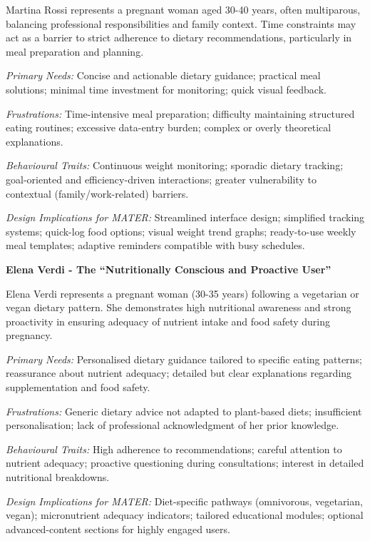 \documentclass[11pt]{article}
\begin{document}
Martina Rossi represents a pregnant woman aged 30-40 years, often multiparous, balancing professional responsibilities and family context. Time constraints may act as a barrier to strict adherence to dietary recommendations, particularly in meal preparation and planning.

\textit{Primary Needs:}
Concise and actionable dietary guidance; practical meal solutions; minimal time investment for monitoring; quick visual feedback.

\textit{Frustrations:}
Time-intensive meal preparation; difficulty maintaining structured eating routines; excessive data-entry burden; complex or overly theoretical explanations.

\textit{ Behavioural Traits:}
Continuous weight monitoring; sporadic dietary tracking; goal-oriented and efficiency-driven interactions; greater vulnerability to contextual (family/work-related) barriers.

\textit{Design Implications for MATER:}
Streamlined interface design; simplified tracking systems; quick-log food options; visual weight trend graphs; ready-to-use weekly meal templates; adaptive reminders compatible with busy schedules.
\vspace{0.5em}

\textbf{Elena Verdi - The ``Nutritionally Conscious and Proactive User''}

Elena Verdi represents a pregnant woman (30-35 years) following a vegetarian or vegan dietary pattern. She demonstrates high nutritional awareness and strong proactivity in ensuring adequacy of nutrient intake and food safety during pregnancy.

\textit{Primary Needs:}
 Personalised dietary guidance tailored to specific eating patterns; reassurance about nutrient adequacy; detailed but clear explanations regarding supplementation and food safety.

\textit{Frustrations:}
Generic dietary advice not adapted to plant-based diets; insufficient personalisation; lack of professional acknowledgment of her prior knowledge.

\textit{ Behavioural Traits:}
High adherence to recommendations; careful attention to nutrient adequacy; proactive questioning during consultations; interest in detailed nutritional breakdowns.

\textit{Design Implications for MATER:}
Diet-specific pathways (omnivorous, vegetarian, vegan); micronutrient adequacy indicators; tailored educational modules; optional advanced-content sections for highly engaged users.
\end{document}
